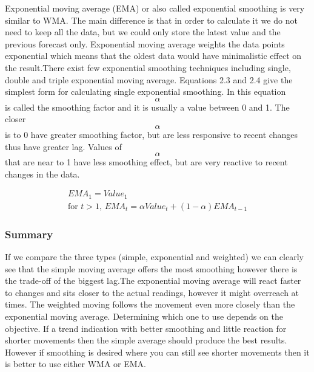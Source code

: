 Exponential moving average (EMA) or also called exponential smoothing is very similar to WMA. The main difference is that in order to calculate it we do not need to keep all the data, but we could only store the latest value and the previous forecast only. Exponential moving average weights the data points exponential which means that the oldest data would have minimalistic effect on the result.There exist few exponential smoothing techniques including single, double and triple exponential moving average. Equations 2.3 and 2.4 give the simplest form for calculating single exponential smoothing. In this equation \[\alpha\] is called the smoothing factor and it is usually a value between 0 and 1. The closer \[\alpha\] is to 0 have greater smoothing factor, but are less responsive to recent changes thus have greater lag. Values of \[\alpha\] that are near to 1 have less smoothing effect, but are very reactive to recent changes in the data. 

\begin{align}\label{ema}
EMA_1 = Value_1 \\
\textrm{for } t > 1\textrm{, }EMA_t = \alpha Value_t + (1-\alpha) EMA_{t-1}
\end{align}

\subsubsection{Summary}
If we compare the three types (simple, exponential and weighted) we can clearly see that the simple moving average offers the most smoothing however there is the trade-off of the biggest lag.The exponential moving average will react faster to changes and sits closer to the actual readings, however it might overreach at times. The weighted moving follows the movement even more closely than the exponential moving average. Determining which one to use depends on the objective. If a trend indication with better smoothing and little reaction for shorter movements then the simple average should produce the best results. However if smoothing is desired where you can still see shorter movements then it is better to use either WMA or EMA.

